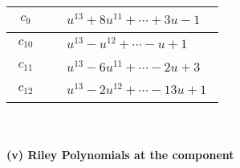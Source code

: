 \documentclass[1p]{elsarticle_modified}
\theoremstyle{definition}
\begin{document}
\begin{tabular}{m{50pt}|m{274pt}}
\hline $$\begin{aligned}c_{9}\end{aligned}$$&$\begin{aligned}
&u^{13}+8 u^{11}+\cdots+3 u-1
\end{aligned}$\\
\hline $$\begin{aligned}c_{10}\end{aligned}$$&$\begin{aligned}
&u^{13}- u^{12}+\cdots- u+1
\end{aligned}$\\
\hline $$\begin{aligned}c_{11}\end{aligned}$$&$\begin{aligned}
&u^{13}-6 u^{11}+\cdots-2 u+3
\end{aligned}$\\
\hline $$\begin{aligned}c_{12}\end{aligned}$$&$\begin{aligned}
&u^{13}-2 u^{12}+\cdots-13 u+1
\end{aligned}$\\
\hline
\end{tabular}\\~\\
\newpage\renewcommand{\arraystretch}{1}
\flushleft \textbf{(v) Riley Polynomials at the component}\newline \\
\end{document}

